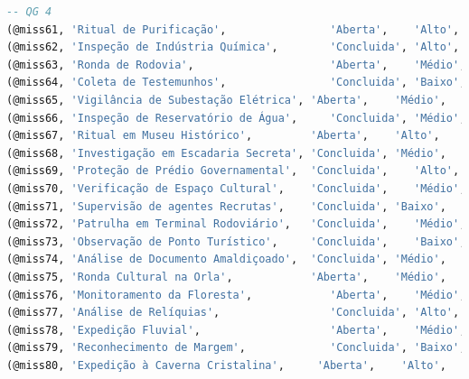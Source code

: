 \documentclass[12pt,a4paper]{report}
\begin{document}
\begin{lstlisting}[language=SQL, caption=population.sql]
-- QG 4
(@miss61, 'Ritual de Purificação',                'Aberta',    'Alto',   'Realizar cerimônia noturna',     '2025-05-16 21:00:00', NULL,         @addr33, @hq4),
(@miss62, 'Inspeção de Indústria Química',        'Concluida', 'Alto',   'Verificar contaminações',        '2025-02-22 14:00:00', '2025-03-13', @addr37, @hq4),
(@miss63, 'Ronda de Rodovia',                     'Aberta',    'Médio',  'Monitorar acidentes',            '2025-04-30 15:00:00', NULL,         @addr38, @hq4),
(@miss64, 'Coleta de Testemunhos',                'Concluida', 'Baixo',  'Registrar depoimentos',          '2025-03-28 10:00:00', '2025-04-09', @addr39, @hq4),
(@miss65, 'Vigilância de Subestação Elétrica', 'Aberta',    'Médio',  'Detectar instabilidade dimensional','2025-05-21 07:00:00', NULL,         @addr70, @hq4),
(@miss66, 'Inspeção de Reservatório de Água',     'Concluida', 'Médio',  'Identificar substâncias encantadas',    '2025-03-13 05:00:00', '2025-04-01', @addr98, @hq6),
(@miss67, 'Ritual em Museu Histórico',         'Aberta',    'Alto',   'Conservar relíquias protegidas',    '2025-05-22 11:00:00', NULL,         @addr71, @hq4),
(@miss68, 'Investigação em Escadaria Secreta', 'Concluida', 'Médio',  'Desvendar padrões ocultos',         '2025-04-05 09:00:00', '2025-04-16', @addr72, @hq4),
(@miss69, 'Proteção de Prédio Governamental',  'Concluida',    'Alto',   'Evitar sabotagens espectrais',      '2025-04-24 08:30:00', '2025-05-14',         @addr73, @hq4),
(@miss70, 'Verificação de Espaço Cultural',    'Concluida',    'Médio',  'Identificar distorções no ar',      '2025-04-26 10:00:00', '2025-05-14',         @addr74, @hq4),
(@miss71, 'Supervisão de agentes Recrutas',    'Concluida', 'Baixo',  'Avaliar habilidades de combate',     '2025-04-03 14:00:00', '2025-04-24', @addr75, @hq4),
(@miss72, 'Patrulha em Terminal Rodoviário',   'Concluida',    'Médio',  'Prevenir influências hostis',       '2025-05-30 12:00:00', '2025-04-14',         @addr76, @hq4),
(@miss73, 'Observação de Ponto Turístico',     'Concluida',    'Baixo',  'Registrar fluxos energéticos',      '2025-04-01 09:30:00', '2025-05-24',         @addr77, @hq4),
(@miss74, 'Análise de Documento Amaldiçoado',  'Concluida', 'Médio',  'Neutralizar efeitos residuais',     '2025-03-17 10:00:00', '2025-04-08', @addr78, @hq4),
(@miss75, 'Ronda Cultural na Orla',            'Aberta',    'Médio',  'Examinar arte urbana ritualística', '2025-06-02 17:30:00', NULL,         @addr79, @hq4),
(@miss76, 'Monitoramento da Floresta',            'Aberta',    'Médio',  'Detectar sinais místicos',       '2025-05-02 07:00:00', NULL,         @addr13, @hq4),
(@miss77, 'Análise de Relíquias',                 'Concluida', 'Alto',   'Catalogar objetos sagrados',     '2025-03-20 09:00:00', '2025-04-01', @addr14, @hq4),
(@miss78, 'Expedição Fluvial',                    'Aberta',    'Médio',  'Explorar igarapés remotos',      '2025-04-18 06:00:00', NULL,         @addr27, @hq4),
(@miss79, 'Reconhecimento de Margem',             'Concluida', 'Baixo',  'Mapear cursos d’água',           '2025-03-05 07:00:00', '2025-03-27', @addr28, @hq4),
(@miss80, 'Expedição à Caverna Cristalina',     'Aberta',    'Alto',   'Explorar cavernas com energia',     '2025-05-21 08:00:00', NULL,         @addr80, @hq4),


\end{lstlisting}
\end{document}
